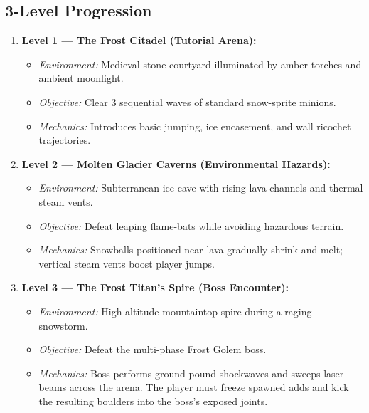 \documentclass[11pt,a4paper]{article}
\begin{document}
\subsection{3-Level Progression}
\begin{enumerate}
    \item \textbf{Level 1 --- The Frost Citadel (Tutorial Arena):}
    \begin{itemize}
        \item \textit{Environment:} Medieval stone courtyard illuminated by amber torches and ambient moonlight.
        \item \textit{Objective:} Clear 3 sequential waves of standard snow-sprite minions.
        \item \textit{Mechanics:} Introduces basic jumping, ice encasement, and wall ricochet trajectories.
    \end{itemize}
    \item \textbf{Level 2 --- Molten Glacier Caverns (Environmental Hazards):}
    \begin{itemize}
        \item \textit{Environment:} Subterranean ice cave with rising lava channels and thermal steam vents.
        \item \textit{Objective:} Defeat leaping flame-bats while avoiding hazardous terrain.
        \item \textit{Mechanics:} Snowballs positioned near lava gradually shrink and melt; vertical steam vents boost player jumps.
    \end{itemize}
    \item \textbf{Level 3 --- The Frost Titan's Spire (Boss Encounter):}
    \begin{itemize}
        \item \textit{Environment:} High-altitude mountaintop spire during a raging snowstorm.
        \item \textit{Objective:} Defeat the multi-phase Frost Golem boss.
        \item \textit{Mechanics:} Boss performs ground-pound shockwaves and sweeps laser beams across the arena. The player must freeze spawned adds and kick the resulting boulders into the boss's exposed joints.
    \end{itemize}
\end{enumerate}
\end{document}
